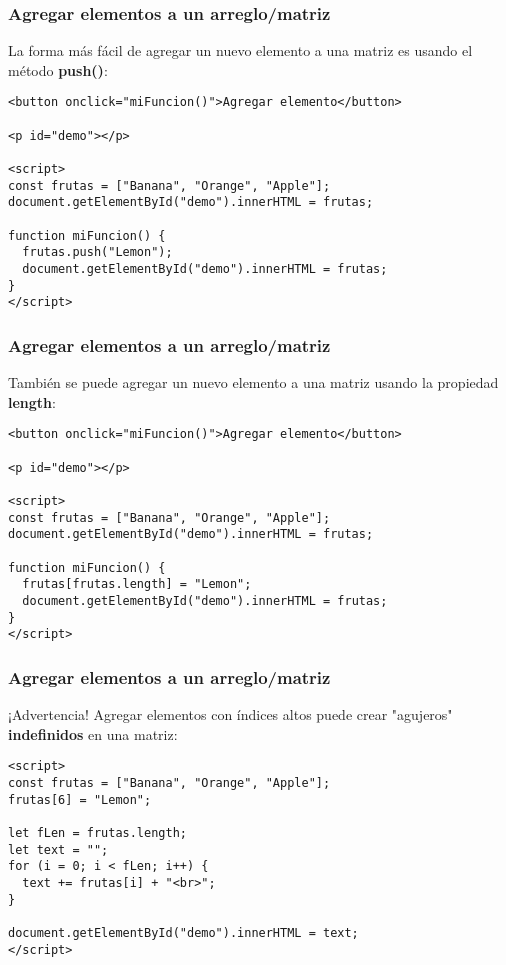 \begin{frame}[fragile]
  \frametitle{Agregar elementos a un arreglo/matriz}

  La forma más fácil de agregar un nuevo elemento a una
  matriz es usando el método \textbf{push()}:

  \vspace{\baselineskip}
  \begin{lstlisting}
<button onclick="miFuncion()">Agregar elemento</button>

<p id="demo"></p>

<script>
const frutas = ["Banana", "Orange", "Apple"];
document.getElementById("demo").innerHTML = frutas;

function miFuncion() {
  frutas.push("Lemon");
  document.getElementById("demo").innerHTML = frutas;
}
</script>
  \end{lstlisting}
\end{frame}

\begin{frame}[fragile]
  \frametitle{Agregar elementos a un arreglo/matriz}

  También se puede agregar un nuevo elemento a una
  matriz usando la propiedad \textbf{length}:

  \vspace{\baselineskip}
  \begin{lstlisting}
<button onclick="miFuncion()">Agregar elemento</button>

<p id="demo"></p>

<script>
const frutas = ["Banana", "Orange", "Apple"];
document.getElementById("demo").innerHTML = frutas;

function miFuncion() {
  frutas[frutas.length] = "Lemon";
  document.getElementById("demo").innerHTML = frutas;
}
</script>
  \end{lstlisting}

\end{frame}

\begin{frame}[fragile]
  \frametitle{Agregar elementos a un arreglo/matriz}

  \begin{alertblock}{¡Advertencia!}
    Agregar elementos con índices altos puede crear "agujeros"
    \textbf{indefinidos} en una matriz:
  \end{alertblock}

  \vspace{\baselineskip}
  \begin{lstlisting}
<script>
const frutas = ["Banana", "Orange", "Apple"];
frutas[6] = "Lemon";

let fLen = frutas.length;
let text = "";
for (i = 0; i < fLen; i++) {
  text += frutas[i] + "<br>";
}

document.getElementById("demo").innerHTML = text;
</script>
  \end{lstlisting}
\end{frame}

